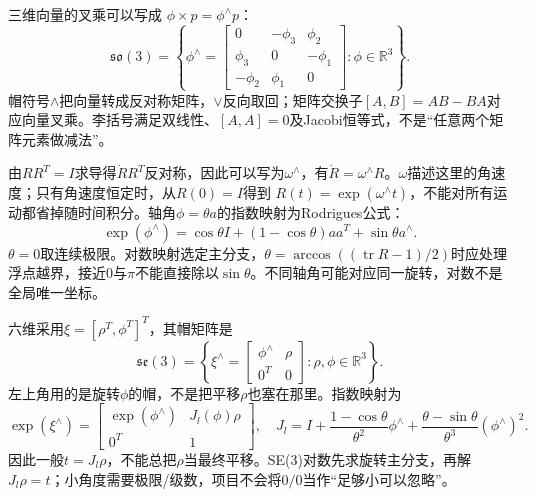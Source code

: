 三维向量的叉乘可以写成 $\phi\times p=\phi^\wedge p$：
\begin{equation}
\mathfrak{so}(3)=\left\{\phi^\wedge=
\begin{bmatrix}0&-\phi_3&\phi_2\\\phi_3&0&-\phi_1\\-\phi_2&\phi_1&0\end{bmatrix}:\phi\in\mathbb R^3\right\}.
\label{eq:so3def}
\end{equation}
帽符号$\wedge$把向量转成反对称矩阵，$\vee$反向取回；矩阵交换子$[A,B]=AB-BA$对应向量叉乘。李括号满足双线性、$[A,A]=0$及Jacobi恒等式，不是“任意两个矩阵元素做减法”。

由$RR^T=I$求导得$\dot R R^T$反对称，因此可以写为$\omega^\wedge$，有$\dot R=\omega^\wedge R$。$\omega$描述这里的角速度；只有角速度恒定时，从$R(0)=I$得到 $R(t)=\exp(\omega^\wedge t)$，不能对所有运动都省掉随时间积分。轴角$\phi=\theta a$的指数映射为Rodrigues公式：
\begin{equation}
\exp(\phi^\wedge)=\cos\theta I+(1-\cos\theta)aa^T+\sin\theta a^\wedge.
\label{eq:rodrigues}
\end{equation}
$\theta=0$取连续极限。对数映射选定主分支，$\theta=\arccos((\operatorname{tr}R-1)/2)$时应处理浮点越界，接近0与$\pi$不能直接除以$\sin\theta$。不同轴角可能对应同一旋转，对数不是全局唯一坐标。

六维采用$\xi=[\rho^T,\phi^T]^T$，其帽矩阵是
\begin{equation}
\mathfrak{se}(3)=\left\{\xi^\wedge=
\begin{bmatrix}\phi^\wedge&\rho\\0^T&0\end{bmatrix}:\rho,\phi\in\mathbb R^3\right\}.
\label{eq:se3def}
\end{equation}
左上角用的是旋转$\phi$的帽，不是把平移$\rho$也塞在那里。指数映射为
\[
\exp(\xi^\wedge)=
\begin{bmatrix}\exp(\phi^\wedge)&J_l(\phi)\rho\\0^T&1\end{bmatrix},\quad
J_l=I+\frac{1-\cos\theta}{\theta^2}\phi^\wedge+
\frac{\theta-\sin\theta}{\theta^3}(\phi^\wedge)^2.
\]
因此一般$t=J_l\rho$，不能总把$\rho$当最终平移。SE(3)对数先求旋转主分支，再解$J_l\rho=t$；小角度需要极限/级数，项目不会将$0/0$当作“足够小可以忽略”。

